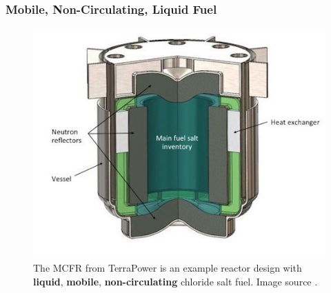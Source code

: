 \begin{frame}
        \frametitle{Mobile, Non-Circulating, Liquid Fuel}
               \begin{figure}[t]
                \vspace*{-0.1in}
			\hspace*{-0.35in}
                \includegraphics[height=0.5\textwidth]{./images/example-mcfr.jpg}
                       \caption{The \gls{MCFR} from TerraPower is an example 
                       reactor design with \textbf{liquid}, \textbf{mobile}, 
                       \textbf{non-circulating} chloride salt fuel. Image 
                       source \cite{terrapower_mcfr_2018,doene_southern_2018}.}
               \end{figure}            
\end{frame}

